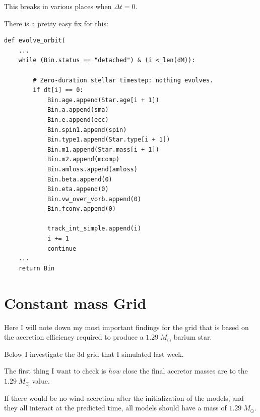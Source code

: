 \documentclass[a4paper,10pt]{article}
\begin{document}
This breaks in various places when \(\Delta t = 0\).

There is a pretty easy fix for this:
\begin{verbatim}
def evolve_orbit(
    ...
    while (Bin.status == "detached") & (i < len(dM)):

        # Zero-duration stellar timestep: nothing evolves.
        if dt[i] == 0:
            Bin.age.append(Star.age[i + 1])
            Bin.a.append(sma)
            Bin.e.append(ecc)
            Bin.spin1.append(spin)
            Bin.type1.append(Star.type[i + 1])
            Bin.m1.append(Star.mass[i + 1])
            Bin.m2.append(mcomp)
            Bin.amloss.append(amloss)
            Bin.beta.append(0)
            Bin.eta.append(0)
            Bin.vw_over_vorb.append(0)
            Bin.fconv.append(0)

            track_int_simple.append(i)
            i += 1
            continue
    ...
    return Bin
\end{verbatim}



\nextpage
\appendix

\section{Constant mass Grid}
Here I will note down my most important findings for the grid that is based on the accretion efficiency required to produce a \(1.29\;M_\odot \) barium star.
\begin{figure}[ht]
    \centering
\end{figure}

Below I investigate the 3d grid that I simulated last week.

The first thing I want to check is \emph{how} close the final accretor masses are to the \(1.29\;M_\odot \) value.

If there would be no wind accretion after the initialization of the models, and they all interact at the predicted time, all models should have a mass of \(1.29\;M_\odot \).
\end{document}
